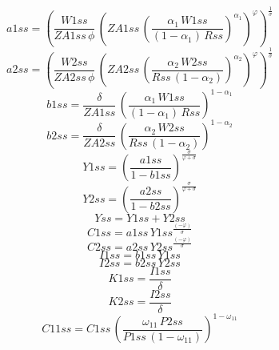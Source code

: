 \begin{dmath*}
a1ss = \left(\frac{{W1ss}}{{ZA1ss}\, {{\phi}}}\, \left({ZA1ss}\, \left(\frac{{{\alpha_{1}}}\, {W1ss}}{\left(1-{{\alpha_{1}}}\right)\, {Rss}}\right)^{{{\alpha_{1}}}}\right)^{{{\varphi}}}\right)^{\frac{1}{{{\sigma}}}}
\end{dmath*}
\begin{dmath*}
a2ss = \left(\frac{{W2ss}}{{ZA2ss}\, {{\phi}}}\, \left({ZA2ss}\, \left(\frac{{{\alpha_{2}}}\, {W2ss}}{{Rss}\, \left(1-{{\alpha_{2}}}\right)}\right)^{{{\alpha_{2}}}}\right)^{{{\varphi}}}\right)^{\frac{1}{{{\sigma}}}}
\end{dmath*}
\begin{dmath*}
b1ss = \frac{{{\delta}}}{{ZA1ss}}\, \left(\frac{{{\alpha_{1}}}\, {W1ss}}{\left(1-{{\alpha_{1}}}\right)\, {Rss}}\right)^{1-{{\alpha_{1}}}}
\end{dmath*}
\begin{dmath*}
b2ss = \frac{{{\delta}}}{{ZA2ss}}\, \left(\frac{{{\alpha_{2}}}\, {W2ss}}{{Rss}\, \left(1-{{\alpha_{2}}}\right)}\right)^{1-{{\alpha_{2}}}}
\end{dmath*}
\begin{dmath*}
Y1ss = \left(\frac{{a1ss}}{1-{b1ss}}\right)^{\frac{{{\sigma}}}{{{\varphi}}+{{\sigma}}}}
\end{dmath*}
\begin{dmath*}
Y2ss = \left(\frac{{a2ss}}{1-{b2ss}}\right)^{\frac{{{\sigma}}}{{{\varphi}}+{{\sigma}}}}
\end{dmath*}
\begin{dmath*}
Yss = {Y1ss}+{Y2ss}
\end{dmath*}
\begin{dmath*}
C1ss = {a1ss}\, {Y1ss}^{\frac{\left(-{{\varphi}}\right)}{{{\sigma}}}}
\end{dmath*}
\begin{dmath*}
C2ss = {a2ss}\, {Y2ss}^{\frac{\left(-{{\varphi}}\right)}{{{\sigma}}}}
\end{dmath*}
\begin{dmath*}
I1ss = {b1ss}\, {Y1ss}
\end{dmath*}
\begin{dmath*}
I2ss = {b2ss}\, {Y2ss}
\end{dmath*}
\begin{dmath*}
K1ss = \frac{{I1ss}}{{{\delta}}}
\end{dmath*}
\begin{dmath*}
K2ss = \frac{{I2ss}}{{{\delta}}}
\end{dmath*}
\begin{dmath*}
C11ss = {C1ss}\, \left(\frac{{{\omega_{11}}}\, {P2ss}}{{P1ss}\, \left(1-{{\omega_{11}}}\right)}\right)^{1-{{\omega_{11}}}}
\end{dmath*}

